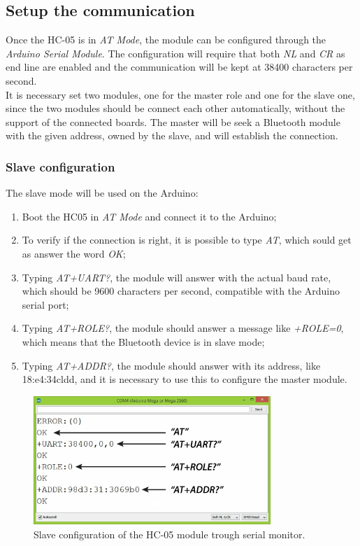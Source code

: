 \subsection{Setup the communication}
Once the HC-05 is in \textit{AT Mode}, the module can be configured through the \textit{Arduino Serial Module}. The configuration will require that both \textit{NL} and \textit{CR} as end line are enabled and the communication will be kept at 38400 characters per second.\\
It is necessary set two modules, one for the master role and one for the slave one, since the two modules should be connect each other automatically, without the support of the connected boards. The master will be seek a Bluetooth module with the given address, owned by the slave, and will establish the connection.

\subsubsection{Slave configuration}
The slave mode will be used on the Arduino:
\begin{enumerate}
	\item Boot the HC05 in \textit{AT Mode} and connect it to the Arduino;
	\item To verify if the connection is right, it is possible to type \textit{AT}, which sould get as answer the word \textit{OK};
	\item Typing \textit{AT+UART?}, the module will answer with the actual baud rate, which should be 9600 characters per second, compatible with the Arduino serial port;
	\item Typing \textit{AT+ROLE?}, the module should answer a message like \textit{+ROLE=0}, which means that the Bluetooth device is in slave mode;
	\item Typing \textit{AT+ADDR?}, the module should answer with its address, like 18:e4:34cldd, and it is necessary to use this to configure the master module.
\end{enumerate}

\begin{figure}[H]
	\hspace*{0.1 \textwidth}\includegraphics[width= 0.8\textwidth]
	{files/images/hc05_slave2}
	\caption{Slave configuration of the HC-05 module trough serial monitor.}
\end{figure}

